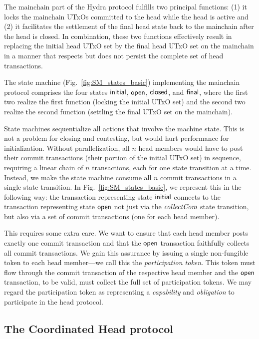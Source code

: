 The mainchain part of the Hydra protocol fulfills two principal
functions: (1) it locks the mainchain UTxOs committed %
to the head while the head is active and (2) it facilitates the
settlement of the final head state back to the mainchain after the
head is closed. In combination, these two functions effectively result
in replacing the initial head UTxO set by the final head UTxO set on
the mainchain in a manner that respects but does not persist the
complete set of head transactions.



The state machine (Fig.~\ref{fig:SM_states_basic}) implementing
the mainchain protocol comprises the four states $\mathsf{initial}$,
$\mathsf{open}$, $\mathsf{closed}$, and $\mathsf{final}$, where the first two realize
the first function (locking the initial UTxO set) and the
second two realize the second function (settling the final UTxO set on
the mainchain).

State machines sequentialize all actions that involve the machine state. This is
not a problem for closing and contesting, but would hurt performance for
initialization. Without parallelization, all $n$ head members would have to post
their commit transactions (their portion of the initial UTxO set) in sequence,
requiring a linear chain of $n$
transactions, %
each for one state transition at a time. Instead, we make the state machine
consume all $n$ commit transactions in a single state transition. In
Fig.~\ref{fig:SM_states_basic}, we represent this in the following way: the
transaction representing state $\mathsf{initial}$ connects to the transaction
representing state $\mathsf{open}$ not just via the $\textit{collectCom}$ state transition, but
also via a set of commit transactions (one for each head member).

This requires some extra care. We want to ensure that each
head member posts exactly one commit transaction and that the $\mathsf{open}$
transaction faithfully collects all commit
transactions. We gain this assurance by issuing a single non-fungible
token to each head member---we call this the \emph{participation
  token}.  This token must flow through the commit transaction of the
respective head member and the $\mathsf{open}$ transaction, to be valid, must
collect the full set of participation tokens. We may regard the
participation token as representing a \emph{capability} and
\emph{obligation} to participate in the head protocol.


\subsection{The Coordinated Head protocol}\label{sec:overview_hp}


